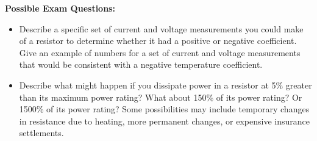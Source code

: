 \vfill
\textbf{Possible Exam Questions:}

\begin{itemize}
\item Describe a specific set of current and voltage measurements you could make of a resistor to determine whether it had a positive or negative coefficient.  Give an example of numbers for a set of current and voltage measurements that would be consistent with a negative temperature coefficient.

\item Describe what might happen if you dissipate power in a resistor at 5\% greater than its maximum power rating?  What about 150\% of its power rating?  Or 1500\% of its power rating?  Some possibilities may include temporary changes in resistance due to heating, more permanent changes, or expensive insurance settlements.
\end{itemize}





